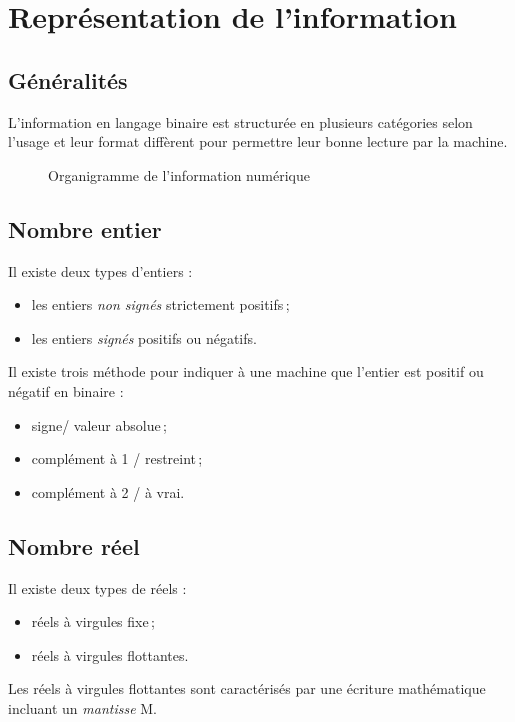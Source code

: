 \documentclass[a4paper, 11pt, twoside, fleqn]{memoir}
\begin{document}
\section{Représentation de l'information}

\subsection{Généralités}

L'information en langage binaire est structurée en plusieurs catégories selon l'usage et leur format diffèrent pour permettre leur bonne lecture par la machine.

\begin{figure}[H]
\caption{Organigramme de l'information numérique}

\end{figure}

\subsection{Nombre entier}

Il existe deux types d'entiers :
\begin{itemize}
\item les entiers \emph{non signés} strictement positifs\,;
\item les entiers \emph{signés} positifs ou négatifs.
\end{itemize}

Il existe trois méthode pour indiquer à une machine que l'entier est positif ou négatif en binaire :
\begin{itemize}
\item signe/ valeur absolue\,;
\item complément à 1 / restreint\,;
\item complément à 2 / à vrai.
\end{itemize}

\subsection{Nombre réel}

Il existe deux types de réels :
\begin{itemize}
\item réels à virgules fixe\,;
\item réels à virgules flottantes.
\end{itemize}

Les réels à virgules flottantes sont caractérisés par une écriture mathématique incluant un \emph{mantisse} M.
\end{document}
